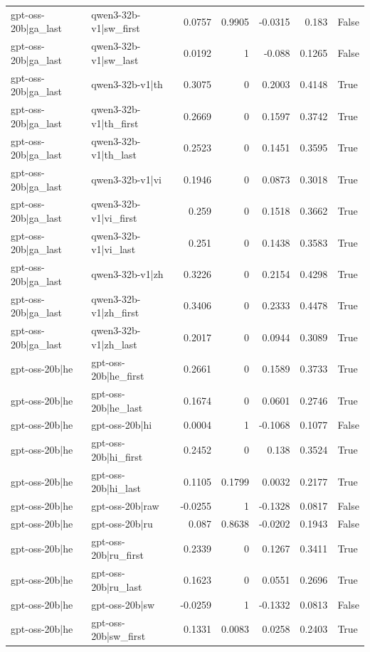 \begin{table}
\begin{tabular}{l l r r r r l}
gpt-oss-20b|ga_last & qwen3-32b-v1|sw_first & 0.0757 & 0.9905 & -0.0315 & 0.183 & False \\
gpt-oss-20b|ga_last & qwen3-32b-v1|sw_last & 0.0192 & 1 & -0.088 & 0.1265 & False \\
gpt-oss-20b|ga_last & qwen3-32b-v1|th & 0.3075 & 0 & 0.2003 & 0.4148 & True \\
gpt-oss-20b|ga_last & qwen3-32b-v1|th_first & 0.2669 & 0 & 0.1597 & 0.3742 & True \\
gpt-oss-20b|ga_last & qwen3-32b-v1|th_last & 0.2523 & 0 & 0.1451 & 0.3595 & True \\
gpt-oss-20b|ga_last & qwen3-32b-v1|vi & 0.1946 & 0 & 0.0873 & 0.3018 & True \\
gpt-oss-20b|ga_last & qwen3-32b-v1|vi_first & 0.259 & 0 & 0.1518 & 0.3662 & True \\
gpt-oss-20b|ga_last & qwen3-32b-v1|vi_last & 0.251 & 0 & 0.1438 & 0.3583 & True \\
gpt-oss-20b|ga_last & qwen3-32b-v1|zh & 0.3226 & 0 & 0.2154 & 0.4298 & True \\
gpt-oss-20b|ga_last & qwen3-32b-v1|zh_first & 0.3406 & 0 & 0.2333 & 0.4478 & True \\
gpt-oss-20b|ga_last & qwen3-32b-v1|zh_last & 0.2017 & 0 & 0.0944 & 0.3089 & True \\
gpt-oss-20b|he & gpt-oss-20b|he_first & 0.2661 & 0 & 0.1589 & 0.3733 & True \\
gpt-oss-20b|he & gpt-oss-20b|he_last & 0.1674 & 0 & 0.0601 & 0.2746 & True \\
gpt-oss-20b|he & gpt-oss-20b|hi & 0.0004 & 1 & -0.1068 & 0.1077 & False \\
gpt-oss-20b|he & gpt-oss-20b|hi_first & 0.2452 & 0 & 0.138 & 0.3524 & True \\
gpt-oss-20b|he & gpt-oss-20b|hi_last & 0.1105 & 0.1799 & 0.0032 & 0.2177 & True \\
gpt-oss-20b|he & gpt-oss-20b|raw & -0.0255 & 1 & -0.1328 & 0.0817 & False \\
gpt-oss-20b|he & gpt-oss-20b|ru & 0.087 & 0.8638 & -0.0202 & 0.1943 & False \\
gpt-oss-20b|he & gpt-oss-20b|ru_first & 0.2339 & 0 & 0.1267 & 0.3411 & True \\
gpt-oss-20b|he & gpt-oss-20b|ru_last & 0.1623 & 0 & 0.0551 & 0.2696 & True \\
gpt-oss-20b|he & gpt-oss-20b|sw & -0.0259 & 1 & -0.1332 & 0.0813 & False \\
gpt-oss-20b|he & gpt-oss-20b|sw_first & 0.1331 & 0.0083 & 0.0258 & 0.2403 & True \\

\end{tabular}
\end{table}

